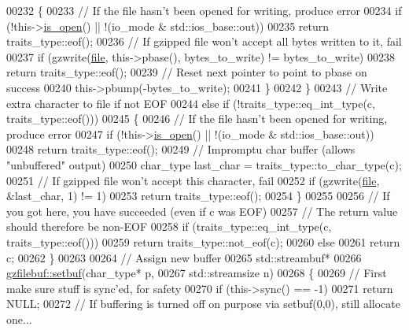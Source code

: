 \begin{DoxyCode}
{00232     \{
00233       \textcolor{comment}{// If the file hasn't been opened for writing, produce error}
00234       \textcolor{keywordflow}{if} (!this->\hyperlink{classgzofstream_acb1c9c6dccaf41bc5e44c2263ea48de3}{is\_open}() || !(io\_mode & std::ios\_base::out))
00235         \textcolor{keywordflow}{return} traits\_type::eof();
00236       \textcolor{comment}{// If gzipped file won't accept all bytes written to it, fail}
00237       \textcolor{keywordflow}{if} (gzwrite(\hyperlink{structfile}{file}, this->pbase(), bytes\_to\_write) != bytes\_to\_write)
00238         \textcolor{keywordflow}{return} traits\_type::eof();
00239       \textcolor{comment}{// Reset next pointer to point to pbase on success}
00240       this->pbump(-bytes\_to\_write);
00241     \}
00242   \}
00243   \textcolor{comment}{// Write extra character to file if not EOF}
00244   \textcolor{keywordflow}{else} \textcolor{keywordflow}{if} (!traits\_type::eq\_int\_type(c, traits\_type::eof()))
00245   \{
00246     \textcolor{comment}{// If the file hasn't been opened for writing, produce error}
00247     \textcolor{keywordflow}{if} (!this->\hyperlink{classgzofstream_acb1c9c6dccaf41bc5e44c2263ea48de3}{is\_open}() || !(io\_mode & std::ios\_base::out))
00248       \textcolor{keywordflow}{return} traits\_type::eof();
00249     \textcolor{comment}{// Impromptu char buffer (allows "unbuffered" output)}
00250     char\_type last\_char = traits\_type::to\_char\_type(c);
00251     \textcolor{comment}{// If gzipped file won't accept this character, fail}
00252     \textcolor{keywordflow}{if} (gzwrite(\hyperlink{structfile}{file}, &last\_char, 1) != 1)
00253       \textcolor{keywordflow}{return} traits\_type::eof();
00254   \}
00255 
00256   \textcolor{comment}{// If you got here, you have succeeded (even if c was EOF)}
00257   \textcolor{comment}{// The return value should therefore be non-EOF}
00258   \textcolor{keywordflow}{if} (traits\_type::eq\_int\_type(c, traits\_type::eof()))
00259     \textcolor{keywordflow}{return} traits\_type::not\_eof(c);
00260   \textcolor{keywordflow}{else}
00261     \textcolor{keywordflow}{return} c;
00262 \}
00263 
00264 \textcolor{comment}{// Assign new buffer}
00265 std::streambuf*
00266 \hyperlink{classgzfilebuf_a856bc21f7cfc6ba43f017c9c3f0d5f81}{gzfilebuf::setbuf}(char\_type* p,
00267                   std::streamsize n)
00268 \{
00269   \textcolor{comment}{// First make sure stuff is sync'ed, for safety}
00270   \textcolor{keywordflow}{if} (this->sync() == -1)
00271     \textcolor{keywordflow}{return} NULL;
00272   \textcolor{comment}{// If buffering is turned off on purpose via setbuf(0,0), still allocate one...}
}
\end{DoxyCode}
